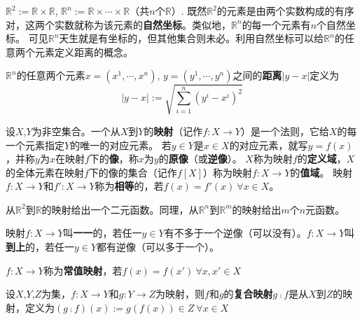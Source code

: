 \begin{example}
$\mathbb{R}^2 := \mathbb{R} \times \mathbb{R}$, $\mathbb{R}^n := \mathbb{R} \times \cdots \times \mathbb{R}$（共$n$个$\mathbb{R}$）.
既然$\mathbb{R}^2$的元素是由两个实数构成的有序对，这两个实数就称为该元素的\textbf{自然坐标}。类似地，$\mathbb{R}^n$的每一个元素有$n$个自然坐标。
可见$\mathbb{R}^n$天生就是有坐标的，但其他集合则未必。利用自然坐标可以给$\mathbb{R}^n$的任意两个元素定义距离的概念。
\end{example}

\begin{definition}
$\mathbb{R}^n$的任意两个元素$x = (x^1, \cdots, x^n)$, $y = (y^1, \cdots, y^n)$之间的\textbf{距离}$|y - x|$定义为
$$|y - x| := \sqrt{\sum^n_{i = 1}(y^i - x^i)^2}$$
\end{definition}

\begin{definition}
设$X$,$Y$为非空集合。一个从$X$到$Y$的\textbf{映射}（记作$f \colon X \to Y$）是一个法则，它给$X$的每一个元素指定$Y$的唯一的对应元素。
若$y \in Y$是$x \in X$的对应元素，就写$y = f(x)$，并称$y$为$x$在映射$f$下的\textbf{像}，称$x$为$y$的\textbf{原像}（或\textbf{逆像}）。
$X$称为映射$f$的\textbf{定义域}，$X$的全体元素在映射$f$下的像的集合（记作$f[X]$）称为映射$f \colon X \to Y$的\textbf{值域}。
映射$f \colon X \to Y$和$f' \colon X \to Y$称为\textbf{相等}的，若$f(x) = f'(x) ~ \forall x \in X$。
\end{definition}

\begin{note}
从$\mathbb{R}^2$到$\mathbb{R}$的映射给出一个二元函数。同理，从$\mathbb{R}^n$到$\mathbb{R}^m$的映射给出$m$个$n$元函数。
\end{note}

\begin{definition}
映射$f \colon X \to Y$叫\textbf{一一}的，若任一$y \in Y$有不多于一个逆像（可以没有）。$f \colon X \to Y$叫\textbf{到上}的，若任一$y \in Y$都有逆像（可以多于一个）。
\end{definition}

\begin{definition}
$f \colon X \to Y$称为\textbf{常值映射}，若$f(x) = f(x') ~ \forall x, x' \in X$
\end{definition}

\begin{definition}
设$X$,$Y$,$Z$为集，$f \colon X \to Y$和$g \colon Y \to Z$为映射，则$f$和$g$的\textbf{复合映射}$g \comp f$是从$X$到$Z$的映射，定义为$(g \comp f)(x) := g(f(x)) \in Z ~ \forall x \in X$
\end{definition}

